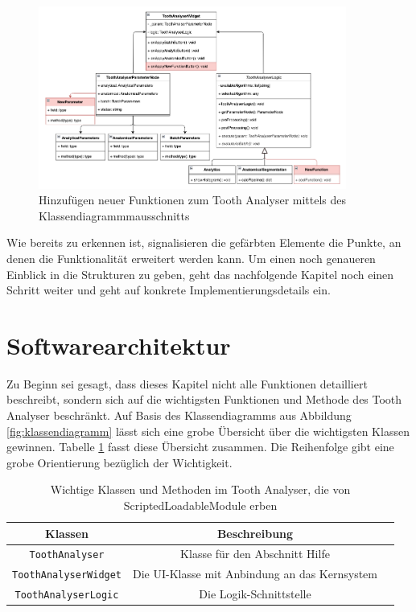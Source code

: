 \begin{figure}[h]
	\centering
	\includegraphics[width=0.9\textwidth]{
		img/tooth_analyser_class_diagram_new.png
	}
	\caption{Hinzufügen neuer Funktionen zum Tooth Analyser mittels des
	Klassendiagrammmausschnitts}
	\label{fig:klassendiagramm_new}
\end{figure}

Wie bereits zu erkennen ist, signalisieren die gefärbten Elemente die Punkte, an
denen die Funktionalität erweitert werden kann. Um einen noch genaueren Einblick
in die Strukturen zu geben, geht das nachfolgende Kapitel noch einen Schritt
weiter und geht auf konkrete Implementierungsdetails ein.

\pagebreak

\section{Softwarearchitektur}
\label{sec:technische_umsetzung} Zu Beginn sei gesagt, dass dieses Kapitel nicht
alle Funktionen detailliert beschreibt, sondern sich auf die wichtigsten Funktionen
und Methode des Tooth Analyser beschränkt. Auf Basis des Klassendiagramms aus
Abbildung \ref{fig:klassendiagramm} lässt sich eine grobe Übersicht über die
wichtigsten Klassen gewinnen. Tabelle \ref{tab:methoden_klassen} fasst diese Übersicht
zusammen. Die Reihenfolge gibt eine grobe Orientierung bezüglich der Wichtigkeit.

\begin{table}[h]
	\centering
	\begin{tabular}{|c|c|c|}
		\hline
		\textbf{Klassen}             & \textbf{Beschreibung}                              \\
		\hline
		\texttt{ToothAnalyser}       & Klasse für den Abschnitt Hilfe                     \\
		\hline
		\texttt{ToothAnalyserWidget} & Die \ac{UI}-Klasse mit Anbindung an das Kernsystem \\
		\hline
		\texttt{ToothAnalyserLogic}  & Die Logik-Schnittstelle                            \\
		\hline
	\end{tabular}
	\caption{Wichtige Klassen und Methoden im Tooth Analyser, die von ScriptedLoadableModule
	erben}
	\label{tab:methoden_klassen}
\end{table}

